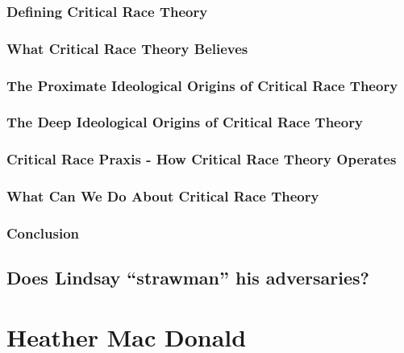\documentclass[10pt,titlepage]{book}
\newcommand{\ignore}[1]{}
\begin{document}
\subsubsection{Defining Critical Race Theory}

\subsubsection{What Critical Race Theory Believes}

\subsubsection{The Proximate Ideological Origins of Critical Race Theory}

\subsubsection{The Deep Ideological Origins of Critical Race Theory}

\subsubsection{Critical Race Praxis - How Critical Race Theory Operates}

\subsubsection{What Can We Do About Critical Race Theory}

\subsubsection{Conclusion}

\subsection{Does Lindsay ``strawman'' his adversaries?}

\ignore{

This has been alleged.
While not by any means constituting an authority on Lindsay, the accusation strikes me as so far off the mark that I wanted to respond with a short twitter thread.

This section is to play with that idea, it might not get anywhere, its probably too hard to do it in a small number of words.

}%

\section{Heather Mac Donald}
\end{document}
